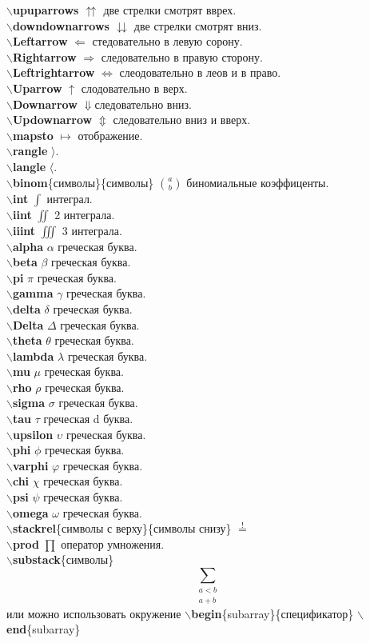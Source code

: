 \documentclass{article}
\newcommand{\bs}{$\backslash$}
\newcommand{\bd}[1]{{\bfseries #1}} %
\newcommand{\bb}[1]{\bd{\bs #1}} %
\begin{document}
\bb{upuparrows} $\upuparrows$ две стрелки смотрят вврех.\\
\bb{downdownarrows} $\downdownarrows$ две стрелки смотрят вниз.\\
\bb{Leftarrow} $\Leftarrow$ стедовательно в левую сорону.\\
\bb{Rightarrow} $\Rightarrow$ следовательно в правую сторону.\\
\bb{Leftrightarrow} $\Leftrightarrow$ слеодовательно в леов и в право.\\
\bb{Uparrow} $\uparrow$ слодовательно в верх.\\
\bb{Downarrow} $\Downarrow$следовательно вниз.\\
\bb{Updownarrow} $\Updownarrow$ следовательно вниз и вверх.\\
\bb{mapsto} $\mapsto$ отображение.\\
\bb{rangle} $\rangle$.\\
\bb{langle} $\langle$.\\
\bb{binom}\{символы\}\{символы\} $\binom{a}{b}$ биномиальные коэффиценты.\\
\bb{int} $\int$ интеграл.\\
\bb{iint} $\iint$ 2 интеграла.\\
\bb{iiint} $\iiint$ 3 интеграла.\\
\bb{alpha} $\alpha$ греческая буква.\\
\bb{beta} $\beta$ греческая буква.\\
\bb{pi} $\pi$ греческая буква.\\
\bb{gamma} $\gamma$ греческая буква.\\
\bb{delta} $\delta$ греческая буква.\\
\bb{Delta} $\Delta$ греческая буква.\\
\bb{theta} $\theta$ греческая буква.\\
\bb{lambda} $\lambda$ греческая буква.\\
\bb{mu} $\mu$ греческая буква.\\
\bb{rho} $\rho$ греческая буква.\\
\bb{sigma} $\sigma$ греческая буква.\\
\bb{tau} $\tau$ греческая d
буква.\\
\bb{upsilon} $\upsilon$ греческая буква.\\
\bb{phi} $\phi$ греческая буква.\\
\bb{varphi} $\varphi$ греческая буква.\\
\bb{chi} $\chi$ греческая буква.\\
\bb{psi} $\psi$ греческая буква.\\
\bb{omega} $\omega$ греческая буква.\\
\bb{stackrel}\{символы с верху\}\{символы снизу\} $\stackrel{!}{=}$\\
\bb{prod} $\prod$ оператор умножения.\\
\bb{substack}\{символы\} \[\sum_{\substack{a<b \\ a+b}}\] или можно использовать
окружение \bb{begin}\{subarray\}\{спецификатор\} \bb{end}\{subarray\}\\ \\
\end{document}
